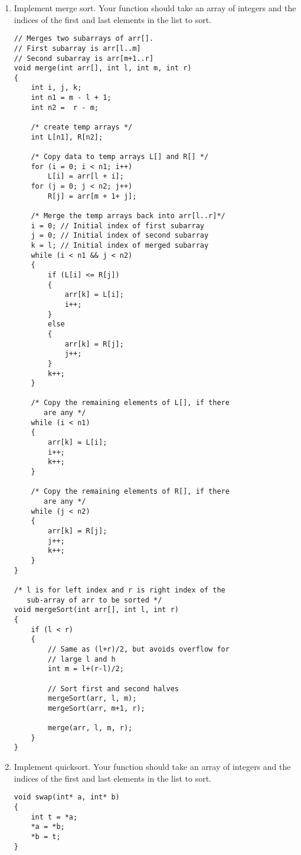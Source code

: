 \documentclass[11pt]{article}
\begin{document}
    \begin{enumerate}
        \item Implement merge sort. Your function should take an array of integers and the indices of the first and last elements in the list to sort.
        \begin{verbatim}
// Merges two subarrays of arr[]. 
// First subarray is arr[l..m] 
// Second subarray is arr[m+1..r] 
void merge(int arr[], int l, int m, int r) 
{ 
    int i, j, k; 
    int n1 = m - l + 1; 
    int n2 =  r - m; 
  
    /* create temp arrays */
    int L[n1], R[n2]; 
  
    /* Copy data to temp arrays L[] and R[] */
    for (i = 0; i < n1; i++) 
        L[i] = arr[l + i]; 
    for (j = 0; j < n2; j++) 
        R[j] = arr[m + 1+ j]; 
  
    /* Merge the temp arrays back into arr[l..r]*/
    i = 0; // Initial index of first subarray 
    j = 0; // Initial index of second subarray 
    k = l; // Initial index of merged subarray 
    while (i < n1 && j < n2) 
    { 
        if (L[i] <= R[j]) 
        { 
            arr[k] = L[i]; 
            i++; 
        } 
        else
        { 
            arr[k] = R[j]; 
            j++; 
        } 
        k++; 
    } 
  
    /* Copy the remaining elements of L[], if there 
       are any */
    while (i < n1) 
    { 
        arr[k] = L[i]; 
        i++; 
        k++; 
    } 
  
    /* Copy the remaining elements of R[], if there 
       are any */
    while (j < n2) 
    { 
        arr[k] = R[j]; 
        j++; 
        k++; 
    } 
} 
  
/* l is for left index and r is right index of the 
   sub-array of arr to be sorted */
void mergeSort(int arr[], int l, int r) 
{ 
    if (l < r) 
    { 
        // Same as (l+r)/2, but avoids overflow for 
        // large l and h 
        int m = l+(r-l)/2; 
  
        // Sort first and second halves 
        mergeSort(arr, l, m); 
        mergeSort(arr, m+1, r); 
  
        merge(arr, l, m, r); 
    } 
}
        \end{verbatim}
        \item Implement quicksort. Your function should take an array of integers and the indices of the first and last elements in the list to sort.
        \begin{verbatim}
void swap(int* a, int* b) 
{ 
    int t = *a; 
    *a = *b; 
    *b = t; 
} 
  

\end{verbatim}
\end{enumerate}
\end{document}
